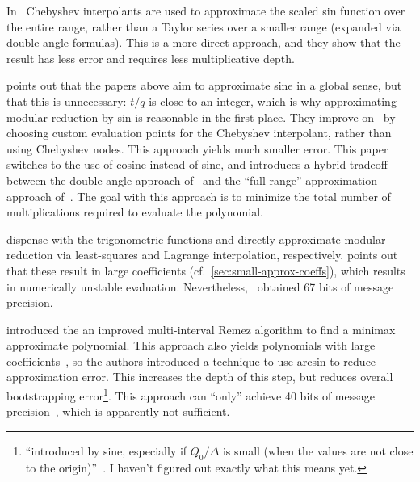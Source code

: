 \documentclass[../fheimpl.tex]{subfiles}
\begin{document}
    In~\cite{cryptoeprint:2018/1043} Chebyshev interpolants are used to approximate the scaled sin function over the entire range, rather than a Taylor series over a smaller range (expanded via double-angle formulas). This is a more direct approach, and they show that the result has less error and requires less multiplicative depth.
    
    \cite{cryptoeprint:2019/688} points out that the papers above aim to approximate sine in a global sense, but that this is unnecessary: $t/q$ is close to an integer, which is why approximating modular reduction by sin is reasonable in the first place. They improve on~\cite{cryptoeprint:2018/1043} by choosing custom evaluation points for the Chebyshev interpolant, rather than using Chebyshev nodes. This approach yields much smaller error. This paper switches to the use of cosine instead of sine, and introduces a hybrid tradeoff between the double-angle approach of~\cite{cryptoeprint:2018/1043} and the ``full-range'' approximation approach of~\cite{cryptoeprint:2018/1043}. The goal with this approach is to minimize the total number of multiplications required to evaluate the polynomial.
    
    \cite{cryptoeprint:2020/488, cryptoeprint:2020/1355} dispense with the trigonometric functions and directly approximate modular reduction via least-squares and Lagrange interpolation, respectively. \cite{cryptoeprint:2020/1549} points out that these result in large coefficients (cf.~\cref{sec:small-approx-coeffs}), which results in numerically unstable evaluation. Nevertheless,~\cite{cryptoeprint:2020/1355} obtained 67 bits of message precision.
    
    \cite{cryptoeprint:2020/552} introduced the an improved multi-interval Remez algorithm to find a minimax approximate polynomial. This approach also yields polynomials with large coefficients~\cite{cryptoeprint:2021/572}, so the authors introduced a technique to use arcsin to reduce approximation error. This increases the depth of this step, but reduces overall bootstrapping error\footnote{``introduced by sine, especially if $Q_0/\Delta$ is small (when the values are not close to the origin)''~\cite{cryptoeprint:2020/1203}. I haven't figured out exactly what this means yet.}. This approach can ``only'' achieve 40 bits of message precision~\cite{cryptoeprint:2021/572}, which is apparently not sufficient.
    
\end{document}
